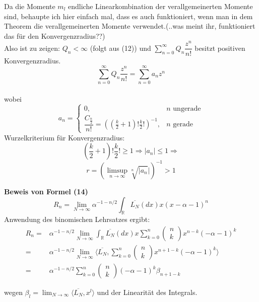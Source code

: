\documentclass[a4paper, 11pt]{scrreprt}
\newcommand{\RR}{\mathbb{R}}
\begin{document}
Da die Momente $ m_l $ endliche Linearkombination der verallgemeinerten Momente sind, behaupte ich hier einfach mal, dass es auch funktioniert, wenn man in dem Theorem die verallgemeinerten Momente verwendet.(..was meint ihr, funktioniert das für den Konvergenzradius??)\\
Also ist zu zeigen: $ Q_n< \infty $ (folgt aus (12)) und $ \sum_{n=0}^{\infty} Q_n \dfrac{z^n}{n!}$ besitzt positiven Konvergenzradius.\\
\[ \sum_{n=0}^{\infty} Q_n \dfrac{z^n}{n!}= \sum_{n=0}^{\infty} a_n z^n\]\\
wobei \[ a_n=\begin{cases} 0, &n\text{ ungerade}\\
	\dfrac{C_{\frac n 2}}{n!}=((\frac{k}{2}+1)!\frac{k}{2}!)^{-1}, &n\text{ gerade} \end{cases} \]
	Wurzelkriterium für Konvergenzradius: 
	\[(\frac{k}{2}+1)!\frac{k}{2}! \geq 1 \Rightarrow \vert a_n \vert \leq 1 \Rightarrow \]
	\[ r=(\limsup_{n \to \infty} \sqrt[n]{\vert a_n} \vert )^{-1} >1 \]
	


\textbf{Beweis von Formel (14)}\\
\begin{equation}
R_n=\lim_{N \to \infty} \alpha^{-1-n/2} \int_{\RR}\overline{L_{N}}(dx)x(x-\alpha-1)^{n} 
\end{equation}
Anwendung des binomischen Lehrsatzes ergibt:
\begin{align*}
 R_n =& \alpha^{-1-n/2} \lim_{N \to \infty} \int_{\RR}\overline{L_{N}}(dx)x \sum_{k=0}^n \begin{pmatrix} n\\k\end{pmatrix} x^{n-k}(-\alpha -1)^k \\
 =& \alpha^{-1-n/2} \lim_{N \to \infty} \langle \overline{L_{N}}, \sum_{k=0}^n \begin{pmatrix} n\\k\end{pmatrix} x^{n+1-k}(-\alpha -1)^k \rangle \\
 =& \alpha^{-1-n/2}\sum_{k=0}^n \begin{pmatrix} n\\k\end{pmatrix} (-\alpha -1)^k \beta_{n+1-k}
\end{align*}

wegen $\beta_l = \lim_{N\to\infty} \langle \overline{L_N}, x^l \rangle$ und der Linearität des Integrals.\\
\end{document}
